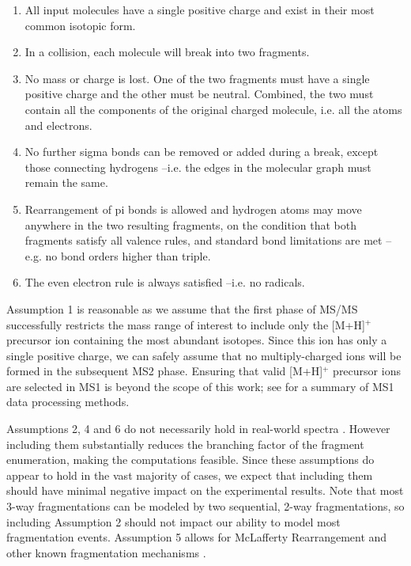 \begin{enumerate}
\item All input molecules have a single positive charge and exist in their most common isotopic form. 
\item In a collision, each molecule will break into two fragments.
\item No mass or charge is lost. One of the two fragments must have a single positive charge and the other must be neutral. Combined, the two must contain all the components of the original charged molecule, i.e. all the atoms and electrons.
\item No further sigma bonds can be removed or added during a break, except those connecting hydrogens --i.e. the edges in the molecular graph must remain the same.
\item Rearrangement of pi bonds is allowed and hydrogen atoms may move anywhere in the two resulting fragments, on the condition that both fragments satisfy all valence rules, and standard bond limitations are met --e.g. no bond orders higher than triple.
\item The even electron rule is always satisfied --i.e. no radicals.
\end{enumerate}

Assumption 1 is reasonable as we assume that the first phase of MS/MS successfully restricts the mass range of interest to include only the [M+H]$^{+}$ precursor ion containing the most abundant isotopes. Since this ion has only a single positive charge, we can safely assume that no multiply-charged ions will be formed in the subsequent MS2 phase. Ensuring that valid [M+H]$^{+}$ precursor ions are selected in MS1 is beyond the scope of this work; see \citet{Katajamaa2007} for a summary of MS1 data processing methods.

Assumptions 2, 4 and 6 do not necessarily hold in real-world spectra \citep{Galezowska2013, Levsen2007}. However including them substantially reduces the branching factor of the fragment enumeration, making the computations feasible. Since these assumptions do appear to hold in the vast majority of cases, we expect that including them should have minimal negative impact on the experimental results. 
Note that most 3-way fragmentations can be modeled by two sequential, 2-way fragmentations, so including Assumption 2 should not impact our ability to model most fragmentation events.
Assumption 5 allows for McLafferty Rearrangement and other known fragmentation mechanisms \citep{McLafferty1993}. 

